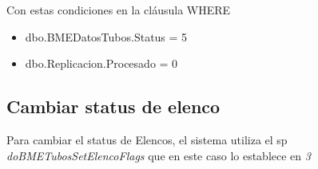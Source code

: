 \documentclass[]{article}
\begin{document}
\par Con estas condiciones en la cláusula WHERE

\begin{itemize}[label=\textcolor{blue}{\textbullet}]
	\item dbo.BMEDatosTubos.Status = 5
	\item dbo.Replicacion.Procesado = 0
\end{itemize}

\subsection{Cambiar status de elenco}

\par Para cambiar el status de Elencos, el sistema utiliza el sp \emph{doBMETubosSetElencoFlags} que en este caso lo establece en \emph {3}
\end{document}
